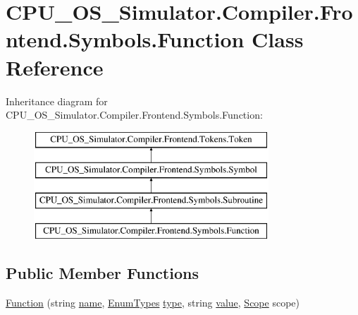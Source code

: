 \hypertarget{class_c_p_u___o_s___simulator_1_1_compiler_1_1_frontend_1_1_symbols_1_1_function}{}\section{C\+P\+U\+\_\+\+O\+S\+\_\+\+Simulator.\+Compiler.\+Frontend.\+Symbols.\+Function Class Reference}
\label{class_c_p_u___o_s___simulator_1_1_compiler_1_1_frontend_1_1_symbols_1_1_function}
Inheritance diagram for C\+P\+U\+\_\+\+O\+S\+\_\+\+Simulator.\+Compiler.\+Frontend.\+Symbols.\+Function\+:\begin{figure}[H]
\begin{center}
\leavevmode
\includegraphics[height=4.000000cm]{class_c_p_u___o_s___simulator_1_1_compiler_1_1_frontend_1_1_symbols_1_1_function}
\end{center}
\end{figure}
\subsection*{Public Member Functions}
\begin{DoxyCompactItemize}
\item 
\hyperlink{class_c_p_u___o_s___simulator_1_1_compiler_1_1_frontend_1_1_symbols_1_1_function_aea1d4951a6a1d6dc5fc504506efb0c33}{Function} (string \hyperlink{class_c_p_u___o_s___simulator_1_1_compiler_1_1_frontend_1_1_symbols_1_1_symbol_a04abf6b34d531519f4f515f3a51e2089}{name}, \hyperlink{namespace_c_p_u___o_s___simulator_1_1_compiler_1_1_frontend_1_1_tokens_a7c0cc43763cc9d01c7d5af34d70b96ea}{Enum\+Types} \hyperlink{class_c_p_u___o_s___simulator_1_1_compiler_1_1_frontend_1_1_tokens_1_1_token_a7ec4dbbde477cd373f8135f0c843a346}{type}, string \hyperlink{class_c_p_u___o_s___simulator_1_1_compiler_1_1_frontend_1_1_symbols_1_1_symbol_a8c243f84c23afefc2b1c26180e187013}{value}, \hyperlink{class_c_p_u___o_s___simulator_1_1_compiler_1_1_frontend_1_1_symbols_1_1_scope}{Scope} scope)
\end{DoxyCompactItemize}
